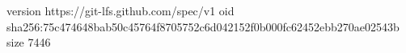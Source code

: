 version https://git-lfs.github.com/spec/v1
oid sha256:75c474648bab50c45764f8705752c6d042152f0b000fc62452ebb270ae02543b
size 7446
